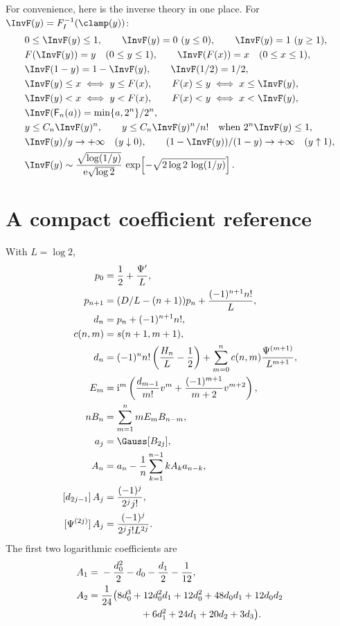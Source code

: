 \documentclass[11pt,oneside]{article}
\theoremstyle{definition}
\theoremstyle{remark}
\newcommand{\e}{\mathrm e}
\newcommand{\ii}{\mathrm i}
\begin{document}
For convenience, here is the inverse theory in one place.  For
$\InvF(y)=F_I^{-1}(\clamp(y))$:
\begin{align*}
&0\leq\InvF(y)\leq1,\qquad
 \InvF(y)=0\ (y\leq0),\qquad
 \InvF(y)=1\ (y\geq1),\\
&F(\InvF(y))=y\quad(0\leq y\leq1),\qquad
 \InvF(F(x))=x\quad(0\leq x\leq1),\\
&\InvF(1-y)=1-\InvF(y),\qquad
 \InvF(1/2)=1/2,\\
&\InvF(y)\leq x\iff y\leq F(x),\qquad
 F(x)\leq y\iff x\leq\InvF(y),\\
&\InvF(y)<x\iff y<F(x),\qquad
 F(x)<y\iff x<\InvF(y),\\
&\InvF(\mathsf F_n(a))
 =\min\{a,2^n\}/2^n,\\
&y\leq C_n\InvF(y)^n,\qquad
 y\leq C_n\InvF(y)^n/n!
 \quad\text{when }2^n\InvF(y)\leq1,\\
&\InvF(y)/y\to+\infty\quad(y\downarrow0),\qquad
 (1-\InvF(y))/(1-y)\to+\infty\quad(y\uparrow1),\\
&\InvF(y)\sim
 \frac{\sqrt{\log(1/y)}}{\e\sqrt{\log2}}\,
 \exp\!\left[-\sqrt{2\log2\,\log(1/y)}\right].
\end{align*}

\section{A compact coefficient reference}
\label{inverse:app:coefficient-reference}

With $L=\log2$,
\begin{align*}
p_0&=\frac12+\frac{\Psi'}L,\\
p_{n+1}&=(D/L-(n+1))p_n+\frac{(-1)^{n+1}n!}{L},\\
d_n&=p_n+(-1)^{n+1}n!,\\
c(n,m)&=s(n+1,m+1),\\
d_n&=(-1)^nn!\left(\frac{H_n}{L}-\frac12\right)
 +\sum_{m=0}^nc(n,m)\frac{\Psi^{(m+1)}}{L^{m+1}},\\
E_m&=\ii^m\left(\frac{d_{m-1}}{m!}v^m+
          \frac{(-1)^{m+1}}{m+2}v^{m+2}\right),\\
nB_n&=\sum_{m=1}^n mE_mB_{n-m},\\
a_j&=\Gauss[B_{2j}],\\
A_n&=a_n-\frac1n\sum_{k=1}^{n-1}kA_ka_{n-k},\\
[d_{2j-1}]\,A_j&=\frac{(-1)^j}{2^jj!},\\
[\Psi^{(2j)}]\,A_j&=\frac{(-1)^j}{2^jj!L^{2j}}.
\end{align*}
The first two logarithmic coefficients are
\begin{align*}
A_1={}&-\frac{d_0^2}{2}-d_0-\frac{d_1}{2}-\frac1{12},\\
A_2={}&\frac1{24}\bigl(
8d_0^3+12d_0^2d_1+12d_0^2+48d_0d_1+12d_0d_2\\
&\hspace{4.1em}{}+6d_1^2+24d_1+20d_2+3d_3
\bigr).
\end{align*}
\end{document}
